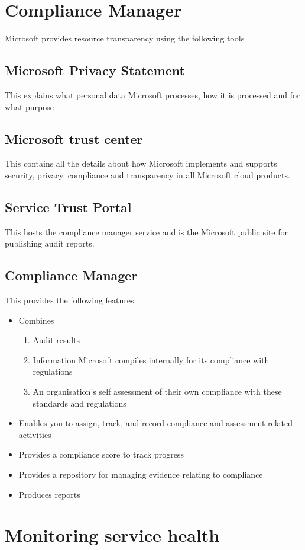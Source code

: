 \documentclass{article}[18pt]
\begin{document}
\section{Compliance Manager}
Microsoft provides resource transparency using the following tools
\subsection{Microsoft Privacy Statement}
This explains what personal data Microsoft processes, how it is processed and for what purpose
\subsection{Microsoft trust center}
This contains all the details about how Microsoft implements and supports security, privacy, compliance and transparency in all Microsoft cloud products.
\subsection{Service Trust Portal}
This hosts the compliance manager service and is the Microsoft public site for publishing audit reports.
\subsection{Compliance Manager}
This provides the following features:
\begin{itemize}
	\item Combines
	\begin{enumerate}
		\item Audit results
		\item Information Microsoft compiles internally for its compliance with regulations
		\item An organisation's self assessment of their own compliance with these standards and regulations
	\end{enumerate}
	\item Enables you to assign, track, and record compliance and assessment-related activities
	\item Provides a compliance score to track progress
	\item Provides a repository for managing evidence relating to compliance
	\item Produces reports
\end{itemize}
\newpage
\section{Monitoring service health}
\end{document}
